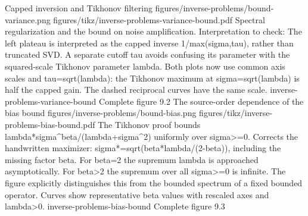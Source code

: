 {Capped inversion and Tikhonov filtering}
{figures/inverse-problems/bound-variance.png}
{figures/tikz/inverse-problems-variance-bound.pdf}
{Spectral regularization and the bound on noise amplification.}
{Interpretation to check: The left plateau is interpreted as the capped inverse 1/max(sigma,tau), rather than truncated SVD. A separate cutoff tau avoids confusing its parameter with the squared-scale Tikhonov parameter lambda. Both plots now use common axis scales and tau=sqrt(lambda): the Tikhonov maximum at sigma=sqrt(lambda) is half the capped gain. The dashed reciprocal curves have the same scale.}
{inverse-problems-variance-bound}
{Complete figure}
{9.2}
{The source-order dependence of the bias bound}
{figures/inverse-problems/bound-bias.png}
{figures/tikz/inverse-problems-bias-bound.pdf}
{The Tikhonov proof bounds lambda*sigma\textasciicircum{}beta/(lambda+sigma\textasciicircum{}2) uniformly over sigma>=0.}
{Corrects the handwritten maximizer: sigma*=sqrt(beta*lambda/(2-beta)), including the missing factor beta. For beta=2 the supremum lambda is approached asymptotically. For beta>2 the supremum over all sigma>=0 is infinite. The figure explicitly distinguishes this from the bounded spectrum of a fixed bounded operator. Curves show representative beta values with rescaled axes and lambda>0.}
{inverse-problems-bias-bound}
{Complete figure}
{9.3}
